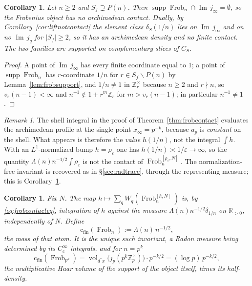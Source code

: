\documentclass[11pt]{amsart}
\newtheorem{corollary}[theorem]{Corollary}
\theoremstyle{definition}
\theoremstyle{remark}
\newtheorem{remark}[theorem]{Remark}
\newcommand{\R}{\mathbb R}
\newcommand{\Z}{\mathbb Z}
\newcommand{\Iml}{\operatorname{Im}}
\newcommand{\Frob}{\operatorname{Frob}}
\newcommand{\supp}{\operatorname{supp}}
\newcommand{\vol}{\operatorname{vol}}
\newcommand{\cfin}{\mathrm{c}_{\mathrm{fin}}}
\begin{document}
\begin{corollary}\label{cor:frobnoarch}
Let $n\ge2$ and $S_f\supsetneq P(n)$. Then
$\supp\Frob_n\cap\Iml\,j_\infty=\emptyset$, so the Frobenius object has no
archimedean contact. Dually, by Corollary~\ref{cor:liftnotcontact} the element
class $\delta_S(1/n)$ lies on $\Iml\,j_\infty$ and on no $\Iml\,j_q$ for
$|S_f|\ge2$, so it has an archimedean density and no finite contact.  The two
families are supported on complementary slices of $C_S$.
\end{corollary}

\begin{proof}
A point of $\Iml\,j_\infty$ has every finite coordinate equal to $1$; a point
of $\supp\Frob_n$ has $r$-coordinate $1/n$ for $r\in S_f\smallsetminus P(n)$ by
Lemma~\ref{lem:frobsupport}, and $1/n\ne1$ in $\Z_r^\times$ because $n\ge2$ and
$r\nmid n$, so $v_r(n-1)<\infty$ and $n^{-1}\notin1+r^m\Z_r$ for
$m>v_r(n-1)$; in particular $n^{-1}\ne1$.
\end{proof}

\begin{remark}\label{rem:profilevalue}
The shell integral in the proof of Theorem~\ref{thm:frobcontact} evaluates the
archimedean profile at the single point $x_\infty=p^{-k}$, because $a_p$ is
\emph{constant} on the shell. What appears is therefore the \emph{value}
$h(1/n)$, not the integral $\int h$. With an $L^1$-normalized bump
$h=\rho_\varepsilon$ one has $h(1/n)\asymp1/\varepsilon\to\infty$, so the
quantity $\Lambda(n)n^{-1/2}\int\rho_\varepsilon$ is not the contact of
$\Frob_n^{[\rho_\varepsilon,N]}$. The normalization-free invariant is recovered
as in \S\ref{sec:radtrace}, through the representing measure; this is
Corollary~\ref{cor:frobinvariant}.
\end{remark}

\begin{corollary}\label{cor:frobinvariant}
Fix $N$. The map $h\mapsto\sum_qW_q(\Frob_n^{[h,N]})$ is, by
\eqref{eq:frobcontacteq}, integration of $h$ against the measure
$\Lambda(n)n^{-1/2}\delta_{1/n}$ on $\R_{>0}$, independently of $N$. Define
\begin{equation}\label{eq:frobcontactdef}
  \cfin(\Frob_n):=\Lambda(n)\,n^{-1/2},
\end{equation}
the mass of that atom. It is the unique such invariant, a Radon measure being
determined by its $C_c^\infty$ integrals, and for $n=p^k$
\begin{equation}\label{eq:frobvolume}
  \cfin(\Frob_{p^k})=\vol_{d^*x}\bigl(j_p(p^k\Z_p^\times)\bigr)\cdot p^{-k/2}
   =(\log p)\,p^{-k/2},
\end{equation}
the multiplicative Haar volume of the support of the object itself, times its
half-density.
\end{corollary}
\end{document}
